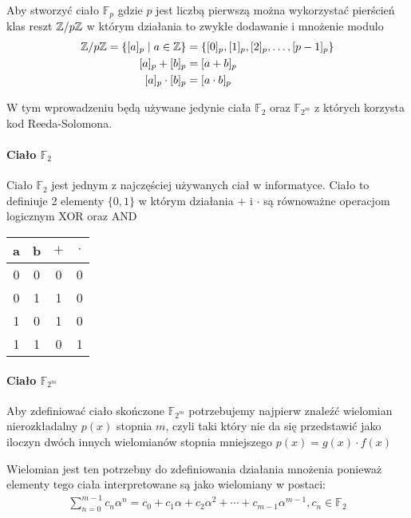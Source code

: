 Aby stworzyć ciało $\mathbb{F}_p$ gdzie $p$ jest liczbą pierwszą można wykorzystać pierścień klas reszt $\mathbb{Z} / p \mathbb{Z}$ w którym działania to zwykłe dodawanie i mnożenie modulo
\begin{align*}
    \mathbb{Z} / p \mathbb{Z} = \{ [a]_p \; | \; a \in \mathbb{Z} \} &= \{ [0]_p, [1]_p,
    [2]_p, \ldots, [p-1]_p \} \\
    [a]_p + [b]_p &= [a + b]_p \\
    [a]_p \cdot [b]_p &= [a \cdot b]_p
\end{align*}

W tym wprowadzeniu będą używane jedynie ciała $\mathbb{F}_2$ oraz $\mathbb{F}_{2^m}$ z których korzysta kod Reeda-Solomona.

\paragraph{Ciało $\mathbb{F}_2$}

Ciało $\mathbb{F}_2$ jest jednym z najczęściej używanych ciał w informatyce. Ciało to definiuje 2 elementy $\{ 0, 1 \}$ w którym działania $+$ i $\cdot$ są równoważne operacjom logicznym XOR oraz AND
\begin{table}[H]
    \centering
    \begin{tabular}{c c | c c}
        \toprule
        a & b & $+$ & $\cdot$ \\
        \midrule
        0 & 0 & 0 & 0 \\
        \midrule
        0 & 1 & 1 & 0 \\
        \midrule
        1 & 0 & 1 & 0 \\
        \midrule
        1 & 1 & 0 & 1 \\
        \bottomrule
    \end{tabular}
\end{table}


\paragraph{Ciało $\mathbb{F}_{2^m}$}

Aby zdefiniować ciało skończone $\mathbb{F}_{2^m}$ potrzebujemy najpierw
znaleźć wielomian nierozkładalny $p(x)$ stopnia $m$, czyli taki który nie
da się przedstawić jako iloczyn dwóch innych wielomianów stopnia
mniejszego $p(x) = g(x) \cdot f(x)$

Wielomian jest ten potrzebny do zdefiniowania działania mnożenia ponieważ elementy tego ciała interpretowane są jako wielomiany w postaci:
\begin{align*}
    \sum_{n=0}^{m-1} c_n \alpha^n = c_{0} + c_{1}\alpha + c_{2}\alpha^{2} + \cdots + c_{m-1}\alpha^{m-1},
    c_{n} \in \mathbb{F}_2
\end{align*}


